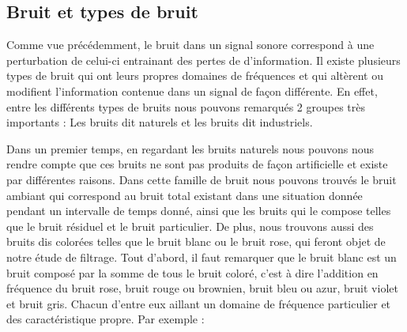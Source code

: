 \documentclass[conference,onecolumn]{IEEEtran}
\begin{document}
\subsection{Bruit et types de bruit}
Comme vue précédemment, le bruit dans un signal sonore correspond à une perturbation de celui-ci entrainant des pertes de d’information. Il existe plusieurs types de bruit qui ont leurs propres domaines de fréquences et qui altèrent ou modifient l’information contenue dans un signal de façon différente. En effet, entre les différents types de bruits nous pouvons remarqués 2 groupes très importants : Les bruits dit naturels et les bruits dit industriels.  

Dans un premier temps, en regardant les bruits naturels nous pouvons nous rendre compte que ces bruits ne sont pas produits de façon artificielle et existe par différentes raisons. Dans cette famille de bruit nous pouvons trouvés le bruit ambiant qui correspond au bruit total existant dans une situation donnée pendant un intervalle de temps donné, ainsi que les bruits qui le compose telles que le bruit résiduel et le bruit particulier. De plus, nous trouvons aussi des bruits dis colorées telles que le bruit blanc ou le bruit rose, qui feront objet de notre étude de filtrage. Tout d’abord, il faut remarquer que le bruit blanc est un bruit composé par la somme de tous le bruit coloré, c’est à dire l’addition en fréquence du bruit rose, bruit rouge ou brownien, bruit bleu ou azur, bruit violet et bruit gris. Chacun d’entre eux aillant un domaine de fréquence particulier et des caractéristique propre. Par exemple :\\
\end{document}
